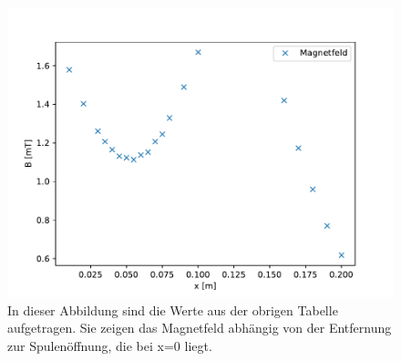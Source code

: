 \documentclass[titlepage = firstcover]{scrartcl}
\begin{document}
                \begin{figure}[h]
                    \centering
                    \includegraphics{HelmholtzB.pdf}
                    \caption{In dieser Abbildung sind die Werte aus der obrigen Tabelle aufgetragen. Sie zeigen das Magnetfeld abhängig von der Entfernung zur Spulenöffnung, die bei x=0 liegt.}
                    \label{fig:HelmholtzB}
    
                \end{figure}
    
                \FloatBarrier
                \newpage
    
\end{document}
